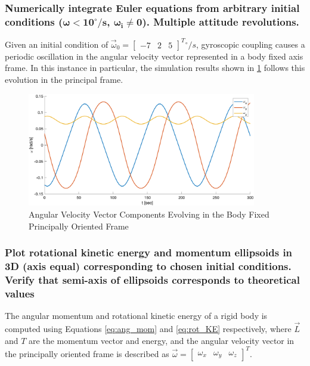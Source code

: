 \subsubsection{Numerically integrate Euler equations from arbitrary initial conditions ($\boldsymbol{\omega < 10^{\circ}/s}$, $\boldsymbol{\omega_i \neq 0}$). Multiple attitude revolutions.}

Given an initial condition of $\vec{\omega}_0 = \begin{bmatrix}
    -7 & 2 & 5
\end{bmatrix}^T {}^{\circ}/s$, gyroscopic coupling causes a periodic oscillation in the angular velocity vector represented in a body fixed axis frame. In this instance in particular, the simulation results shown in \ref{fig:sim_omegas} follows this evolution in the principal frame.

\begin{figure}[H]
    \centering
    \captionsetup{justification = centering}
    \includegraphics[width = 10cm] {Images/omega_prop_random.png}
    \caption{Angular Velocity Vector Components Evolving in the Body Fixed Principally Oriented Frame}
    \label{fig:sim_omegas}
\end{figure}

\subsubsection{Plot rotational kinetic energy and momentum ellipsoids in 3D (axis equal) corresponding to chosen initial conditions. Verify that semi-axis of ellipsoids corresponds to theoretical values} \label{sec:ellipsoid_definitions}

The angular momentum and rotational kinetic energy of a rigid body is computed using Equations \ref{eq:ang_mom} and \ref{eq:rot_KE} respectively, where $\vec{L}$ and $T$ are the momentum vector and energy, and the angular velocity vector in the principally oriented frame is described as $\vec{\omega} = \begin{bmatrix} \omega_x & \omega_y & \omega_z \end{bmatrix}^T$. 

